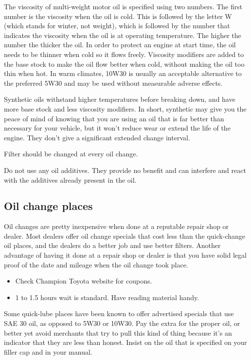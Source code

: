 \documentclass[oneside, article]{memoir}
\begin{document}
The viscosity of multi-weight motor oil is specified using two numbers. The first number is the viscosity when the oil is cold. This is followed by the letter W (which stands for winter, not weight), which is followed by the number that indicates the viscosity when the oil is at operating temperature. The higher the number the thicker the oil. In order to protect an engine at start time, the oil needs to be thinner when cold so it flows freely. Viscosity modifiers are added to the base stock to make the oil flow better when cold, without making the oil too thin when hot. In warm climates, 10W30 is usually an acceptable alternative to the preferred 5W30 and may be used without measurable adverse effects.

Synthetic oils withstand higher temperatures before breaking down, and have more base stock and less viscosity modifiers. In short, synthetic may give you the peace of mind of knowing that you are using an oil that is far better than necessary for your vehicle, but it won't reduce wear or extend the life of the engine. They don't give a significant extended change interval.

Filter should be changed at every oil change.

Do not use any oil additives. They provide no benefit and can interfere and react with the additives already present in the oil.

\subsection{Oil change places}

Oil changes are pretty inexpensive when done at a reputable repair shop or dealer. Most dealers offer oil change specials that cost less than the quick-change oil places, and the dealers do a better job and use better filters. Another advantage of having it done at a repair shop or dealer is that you have solid legal proof of the date and mileage when the oil change took place.

\begin{itemize}
\item Check Champion Toyota website for coupons.
\item 1 to 1.5 hours wait is standard. Have reading material handy.
\end{itemize}

Some quick-lube places have been known to offer advertised specials that use SAE 30 oil, as opposed to 5W30 or 10W30. Pay the extra for the proper oil, or better yet avoid merchants that try to pull this kind of thing because it's an indicator that they are less than honest. Insist on the oil that is specified on your filler cap and in your manual.
\end{document}

